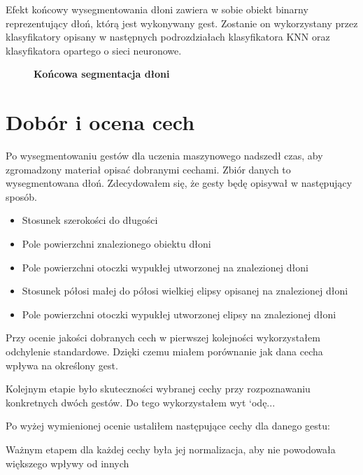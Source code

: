 \documentclass[a4paper,12pt,twoside,openany]{report}
\newcommand{\ImgPath}{.}
\begin{document}
Efekt końcowy wysegmentowania dłoni zawiera w sobie obiekt binarny reprezentujący dłoń, którą jest wykonywany gest.
Zostanie on wykorzystany przez klasyfikatory opisany w następnych podrozdziałach klasyfikatora KNN oraz klasyfikatora opartego o sieci neuronowe.
\begin{figure}[H]
	\centering
	\caption{  \textbf{Końcowa segmentacja dłoni}}
\end{figure} 

\section{Dobór i ocena cech}
Po wysegmentowaniu gestów dla uczenia maszynowego nadszedł czas, aby zgromadzony materiał opisać dobranymi cechami. Zbiór danych to wysegmentowana dłoń. Zdecydowałem się, że gesty będę opisywał w następujący sposób.

\begin{itemize}
	\item Stosunek szerokości do długości 
	\item Pole powierzchni znalezionego obiektu dłoni
	\item Pole powierzchni otoczki wypukłej utworzonej na znalezionej dłoni
	\item Stosunek półosi małej do półosi wielkiej elipsy opisanej na znalezionej dłoni
	\item Pole powierzchni otoczki wypukłej utworzonej elipsy na znalezionej dłoni
\end{itemize}

Przy ocenie jakości dobranych cech w pierwszej kolejności wykorzystałem odchylenie standardowe. Dzięki czemu miałem porównanie jak dana cecha wpływa na określony gest. 



Kolejnym etapie było skuteczności wybranej cechy przy rozpoznawaniu konkretnych dwóch gestów. Do tego wykorzystałem wyt	`odę...

Po wyżej wymienionej ocenie ustaliłem następujące cechy dla danego gestu:

Ważnym etapem dla każdej cechy była jej normalizacja, aby nie powodowała większego wpływy od innych
\end{document}
